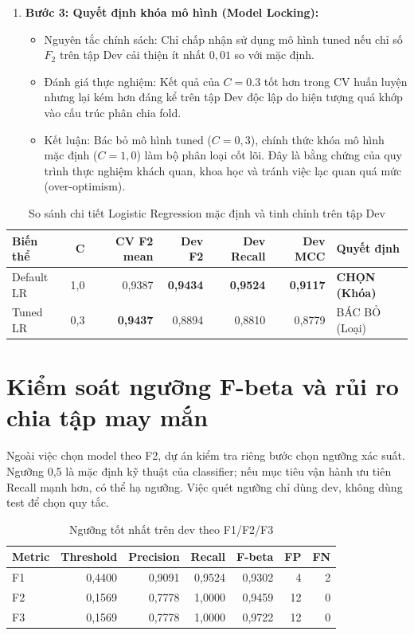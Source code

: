 \documentclass[12pt,a4paper,oneside]{report}
\begin{document}
\begin{enumerate}
    \item \textbf{Bước 3: Quyết định khóa mô hình (Model Locking):}
    \begin{itemize}
        \item Nguyên tắc chính sách: Chỉ chấp nhận sử dụng mô hình tuned nếu chỉ số $F_2$ trên tập Dev cải thiện ít nhất $0{,}01$ so với mặc định.
        \item Đánh giá thực nghiệm: Kết quả của $C=0.3$ tốt hơn trong CV huấn luyện nhưng lại kém hơn đáng kể trên tập Dev độc lập do hiện tượng quá khớp vào cấu trúc phân chia fold.
        \item Kết luận: Bác bỏ mô hình tuned ($C=0{,}3$), chính thức khóa mô hình mặc định ($C=1{,}0$) làm bộ phân loại cốt lõi. Đây là bằng chứng của quy trình thực nghiệm khách quan, khoa học và tránh việc lạc quan quá mức (over-optimism).
    \end{itemize}
\end{enumerate}

\begin{table}[H]
\centering
\caption{So sánh chi tiết Logistic Regression mặc định và tinh chỉnh trên tập Dev}
\begin{tabular}{lrrrrrl}
\toprule
Biến thể & C & CV F2 mean & Dev F2 & Dev Recall & Dev MCC & Quyết định\\
\midrule
Default LR & 1,0 & 0,9387 & \textbf{0,9434} & \textbf{0,9524} & \textbf{0,9117} & \textbf{CHỌN (Khóa)}\\
Tuned LR & 0,3 & \textbf{0,9437} & 0,8894 & 0,8810 & 0,8779 & BÁC BỎ (Loại)\\
\bottomrule
\end{tabular}
\end{table}

\section{Kiểm soát ngưỡng F-beta và rủi ro chia tập may mắn}

Ngoài việc chọn model theo F2, dự án kiểm tra riêng bước chọn ngưỡng xác suất.
Ngưỡng 0,5 là mặc định kỹ thuật của classifier; nếu mục tiêu vận hành ưu tiên
Recall mạnh hơn, có thể hạ ngưỡng. Việc quét ngưỡng chỉ dùng dev, không dùng
test để chọn quy tắc.

\begin{table}[H]
\centering
\caption{Ngưỡng tốt nhất trên dev theo F1/F2/F3}
\begin{tabular}{lrrrrrr}
\toprule
Metric & Threshold & Precision & Recall & F-beta & FP & FN\\
\midrule
F1 & 0,4400 & 0,9091 & 0,9524 & 0,9302 & 4 & 2\\
F2 & 0,1569 & 0,7778 & 1,0000 & 0,9459 & 12 & 0\\
F3 & 0,1569 & 0,7778 & 1,0000 & 0,9722 & 12 & 0\\
\bottomrule
\end{tabular}
\end{table}
\end{document}
